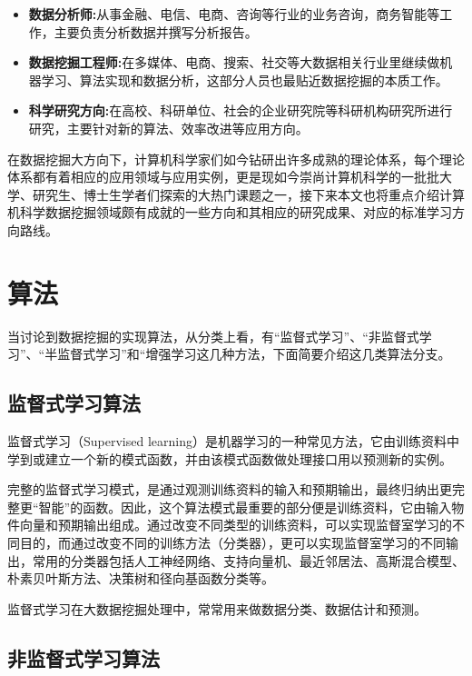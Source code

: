 \documentclass{misc/elegantpaper}
\begin{document}
\begin{itemize}[noitemsep]
      \item \textbf{数据分析师:}从事金融、电信、电商、咨询等行业的业务咨询，商务智能等工作，主要负责分析数据并撰写分析报告。
      \item \textbf{数据挖掘工程师:}在多媒体、电商、搜索、社交等大数据相关行业里继续做机器学习、算法实现和数据分析，这部分人员也最贴近数据挖掘的本质工作。
      \item \textbf{科学研究方向:}在高校、科研单位、社会的企业研究院等科研机构研究所进行研究，主要针对新的算法、效率改进等应用方向。
\end{itemize}

在数据挖掘大方向下，计算机科学家们如今钻研出许多成熟的理论体系，每个理论体系都有着相应的应用领域与应用实例，更是现如今崇尚计算机科学的一批批大学、研究生、博士生学者们探索的大热门课题之一，接下来本文也将重点介绍计算机科学数据挖掘领域颇有成就的一些方向和其相应的研究成果、对应的标准学习方向路线。


\section{算法}

当讨论到数据挖掘的实现算法，从分类上看，有“监督式学习”、“非监督式学习”、“半监督式学习”和“增强学习这几种方法，下面简要介绍这几类算法分支。

\subsection{监督式学习算法}

监督式学习（Supervised learning）是机器学习的一种常见方法，它由训练资料中学到或建立一个新的模式函数，并由该模式函数做处理接口用以预测新的实例。

完整的监督式学习模式，是通过观测训练资料的输入和预期输出，最终归纳出更完整更“智能”的函数。因此，这个算法模式最重要的部分便是训练资料，它由输入物件向量和预期输出组成。通过改变不同类型的训练资料，可以实现监督室学习的不同目的，而通过改变不同的训练方法（分类器），更可以实现监督室学习的不同输出，常用的分类器包括人工神经网络、支持向量机、最近邻居法、高斯混合模型、朴素贝叶斯方法、决策树和径向基函数分类等。

监督式学习在大数据挖掘处理中，常常用来做数据分类、数据估计和预测。

\subsection{非监督式学习算法}
\end{document}
